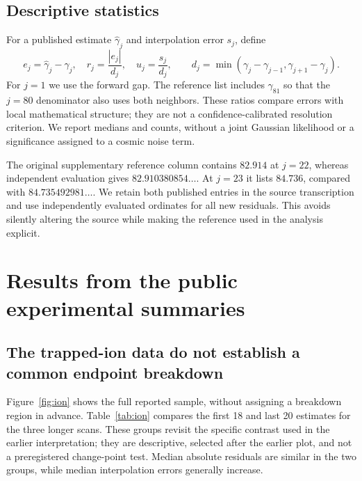 \documentclass[aps,pra,onecolumn,amsmath,amssymb,nofootinbib,superscriptaddress,floatfix,11pt]{revtex4-2}
\begin{document}
\subsection{Descriptive statistics}
For a published estimate $\widehat\gamma_j$ and interpolation error $s_j$, define
\begin{equation}
 e_j=\widehat\gamma_j-\gamma_j,\quad
 r_j=\frac{|e_j|}{d_j},\quad u_j=\frac{s_j}{d_j},\qquad
 d_j=\min(\gamma_j-\gamma_{j-1},\gamma_{j+1}-\gamma_j).
 \label{eq:diagnostics}
\end{equation}
For $j=1$ we use the forward gap. The reference list includes $\gamma_{81}$ so that the $j=80$ denominator also uses both neighbors. These ratios compare errors with local mathematical structure; they are not a confidence-calibrated resolution criterion. We report medians and counts, without a joint Gaussian likelihood or a significance assigned to a cosmic noise term.

The original supplementary reference column contains $82.914$ at $j=22$, whereas independent evaluation gives $82.910380854\ldots$. At $j=23$ it lists $84.736$, compared with $84.735492981\ldots$. We retain both published entries in the source transcription and use independently evaluated ordinates for all new residuals. This avoids silently altering the source while making the reference used in the analysis explicit.

\section{Results from the public experimental summaries}
\subsection{The trapped-ion data do not establish a common endpoint breakdown}
Figure~\ref{fig:ion} shows the full reported sample, without assigning a breakdown region in advance. Table~\ref{tab:ion} compares the first 18 and last 20 estimates for the three longer scans. These groups revisit the specific contrast used in the earlier interpretation; they are descriptive, selected after the earlier plot, and not a preregistered change-point test. Median absolute residuals are similar in the two groups, while median interpolation errors generally increase.

\begin{table}[htbp]
\caption{Descriptive trapped-ion diagnostics using independently computed reference ordinates. All values are in dimensionless ordinate units. The reported $s_j$ describes the source interpolation procedure and is not a complete systematic uncertainty.}
\label{tab:ion}
\centering

\end{table}
\end{document}
